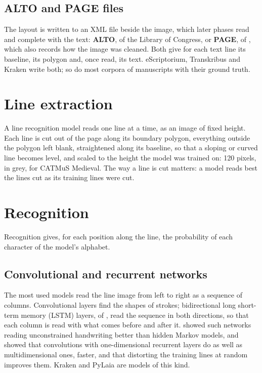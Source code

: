 \subsection{ALTO and PAGE files}
The layout is written to an XML file beside the image, which later phases read and complete with the text:
\textbf{ALTO}, of the Library of Congress, or \textbf{PAGE}, of
, which also records how the image was cleaned. Both give
for each text line its baseline, its polygon and, once read, its text. eScriptorium, Transkribus and Kraken write
both; so do most corpora of manuscripts with their ground truth.

\section{Line extraction}\label{sec:lines}
A line recognition model reads one line at a time, as an image of fixed height. Each line is cut out of the page
along its boundary polygon, everything outside the polygon left blank, straightened along its baseline, so that a
sloping or curved line becomes level, and scaled to the height the model was trained on: 120 pixels, in grey, for
CATMuS Medieval. The way a line is cut matters: a model reads best the lines cut as its training lines were cut.

\section{Recognition}\label{sec:recognition}
Recognition gives, for each position along the line, the probability of each character of the model's alphabet.

\subsection{Convolutional and recurrent networks}
The most used models read the line image from left to right as a sequence of columns. Convolutional layers find the
shapes of strokes; bidirectional long short-term memory (LSTM) layers, of
, read the sequence in both directions, so that each column is read
with what comes before and after it.  showed such networks reading unconstrained handwriting better than hidden Markov models, and
 showed that convolutions with one-dimensional recurrent layers do as well as
multidimensional ones, faster, and that distorting the training lines at random improves them. Kraken and PyLaia
are models of this kind.

